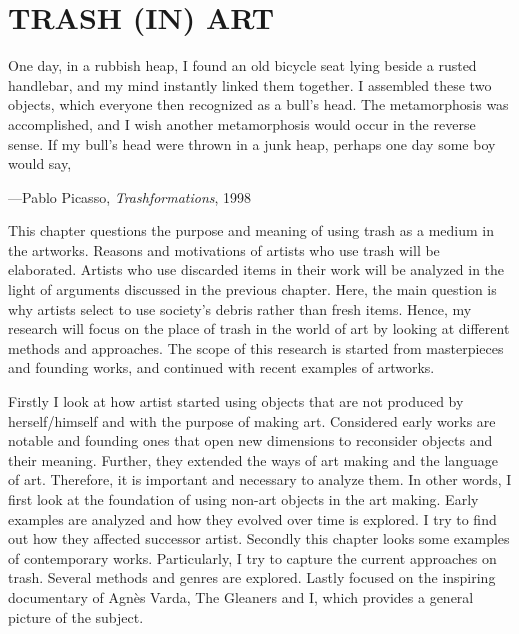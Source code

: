 \chapter{TRASH (IN) ART}



\begin{singlespace}
\epigraph{One day, in a rubbish heap, I found an old bicycle seat lying beside a rusted handlebar, and my mind instantly linked them together. I assembled these two objects, which everyone then recognized as a bull’s head. The metamorphosis was accomplished, and I wish another metamorphosis would occur in the reverse sense. If my bull’s head were thrown in a junk heap, perhaps one day some boy would say, }{\hfill ---Pablo Picasso, \textit{Trashformations}, 1998}
\end{singlespace}



This chapter questions the purpose and meaning of using trash as a medium in the artworks. Reasons and motivations of artists who use trash will be elaborated. Artists who use discarded items in their work will be analyzed in the light of arguments discussed in the previous chapter. Here, the main question is why artists select to use society’s debris rather than fresh items. Hence, my research will focus on the place of trash in the world of art by looking at different methods and approaches. The scope of this research is started from masterpieces and founding works, and continued with recent examples of artworks.

Firstly I look at how artist started using objects that are not produced by herself/himself and with the purpose of making art. Considered early works are notable and founding ones that open new dimensions to reconsider objects and their meaning. Further, they extended the ways of art making and the language of art. Therefore, it is important and necessary to analyze them. In other words, I first look at the foundation of using non-art objects in the art making. Early examples are analyzed and how they evolved over time is explored. I try to find out how they affected successor artist. Secondly this chapter looks some examples of contemporary works. Particularly, I try to capture the current approaches on trash. Several methods and genres are explored. Lastly focused on the inspiring documentary of Agnès Varda, The Gleaners and I, which provides a general picture of the subject.




